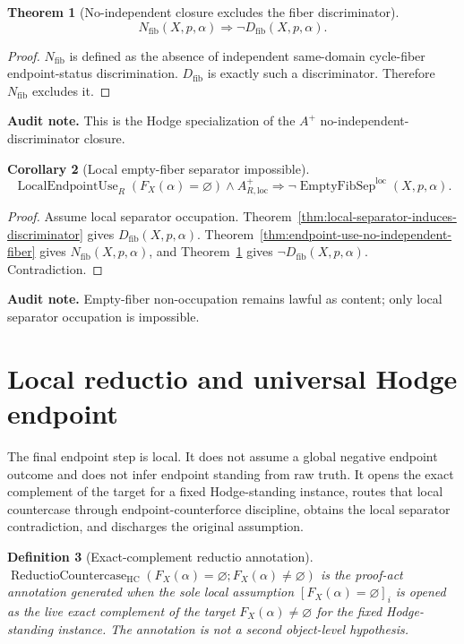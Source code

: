 \documentclass[11pt]{article}
\newtheorem{theorem}{Theorem}[section]
\newtheorem{corollary}[theorem]{Corollary}
\newtheorem{definition}[theorem]{Definition}
\newcommand{\HC}{\operatorname{HC}}
\newcommand{\Aplus}{A^+}
\newcommand{\EmptySep}{\operatorname{EmptyFibSep}}
\begin{document}
\begin{theorem}[No-independent closure excludes the fiber discriminator]\label{thm:no-independent-excludes-fiber}
\[
N_{\mathrm{fib}}(X,p,\alpha)\Rightarrow \neg D_{\mathrm{fib}}(X,p,\alpha).
\]
\end{theorem}
\begin{proof}
$N_{\mathrm{fib}}$ is defined as the absence of independent same-domain cycle-fiber endpoint-status discrimination.  $D_{\mathrm{fib}}$ is exactly such a discriminator.  Therefore $N_{\mathrm{fib}}$ excludes it.
\end{proof}
\par\noindent\textbf{Audit note.} This is the Hodge specialization of the $A^+$ no-independent-discriminator closure.

\begin{corollary}[Local empty-fiber separator impossible]\label{cor:local-empty-fiber-separator-impossible}
\[
\operatorname{LocalEndpointUse}_R(F_X(\alpha)=\varnothing)\wedge \Aplus_{R,\mathrm{loc}}
\Rightarrow \neg\EmptySep^{\mathrm{loc}}(X,p,\alpha).
\]
\end{corollary}
\begin{proof}
Assume local separator occupation.  Theorem~\ref{thm:local-separator-induces-discriminator} gives $D_{\mathrm{fib}}(X,p,\alpha)$.  Theorem~\ref{thm:endpoint-use-no-independent-fiber} gives $N_{\mathrm{fib}}(X,p,\alpha)$, and Theorem~\ref{thm:no-independent-excludes-fiber} gives $\neg D_{\mathrm{fib}}(X,p,\alpha)$.  Contradiction.
\end{proof}
\par\noindent\textbf{Audit note.} Empty-fiber non-occupation remains lawful as content; only local separator occupation is impossible.


\section{Local reductio and universal Hodge endpoint}

The final endpoint step is local.  It does not assume a global negative endpoint outcome and does not infer endpoint standing from raw truth.  It opens the exact complement of the target for a fixed Hodge-standing instance, routes that local countercase through endpoint-counterforce discipline, obtains the local separator contradiction, and discharges the original assumption.

\begin{definition}[Exact-complement reductio annotation]
$\operatorname{ReductioCountercase}_{\HC}(F_X(\alpha)=\varnothing;F_X(\alpha)\neq\varnothing)$ is the proof-act annotation generated when the sole local assumption $[F_X(\alpha)=\varnothing]_i$ is opened as the live exact complement of the target $F_X(\alpha)\neq\varnothing$ for the fixed Hodge-standing instance.  The annotation is not a second object-level hypothesis.
\end{definition}
\end{document}

